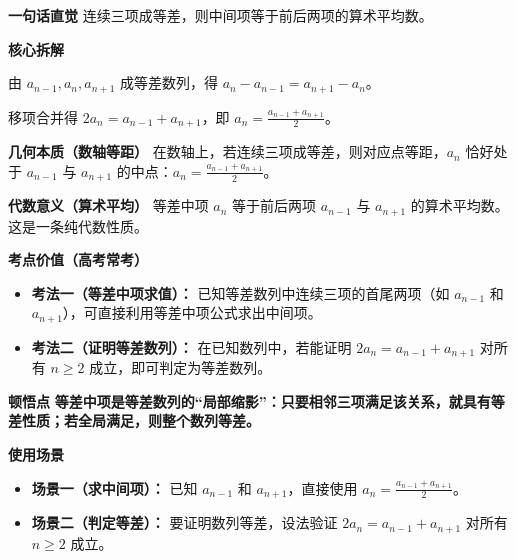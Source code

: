 \begin{explanationbox}
	\textbf{\textcolor{CExplanation}{一句话直觉}}
	连续三项成等差，则中间项等于前后两项的算术平均数。

	\medskip
	\textbf{\textcolor{CExplanation}{核心拆解}}
	\begin{description}[style=nextline, leftmargin=2.8em, labelsep=0.5em, itemsep=0.45em]
		\item[\textbf{要点一（等差定义）：}]
			由 $a_{n-1},a_n,a_{n+1}$ 成等差数列，得 $a_n - a_{n-1} = a_{n+1} - a_n$。
		\item[\textbf{要点二（移项化简）：}]
			移项合并得 $2a_n = a_{n-1}+a_{n+1}$，即 $a_n = \frac{a_{n-1}+a_{n+1}}{2}$。
	\end{description}

	\medskip
	\textbf{\textcolor{CExplanation}{几何本质（数轴等距）}}
	在数轴上，若连续三项成等差，则对应点等距，$a_n$ 恰好处于 $a_{n-1}$ 与 $a_{n+1}$ 的中点：$a_n = \frac{a_{n-1}+a_{n+1}}{2}$。

	\medskip
	\textbf{\textcolor{CExplanation}{代数意义（算术平均）}}
	等差中项 $a_n$ 等于前后两项 $a_{n-1}$ 与 $a_{n+1}$ 的算术平均数。这是一条纯代数性质。

	\medskip
	\textbf{\textcolor{CExplanation}{考点价值（高考常考）}}
	\begin{itemize}[leftmargin=*, itemsep=0.5em, topsep=0.4em]
		\item \textbf{考法一（等差中项求值）：} 已知等差数列中连续三项的首尾两项（如 $a_{n-1}$ 和 $a_{n+1}$），可直接利用等差中项公式求出中间项。
		\item \textbf{考法二（证明等差数列）：} 在已知数列中，若能证明 $2a_n = a_{n-1}+a_{n+1}$ 对所有 $n\ge 2$ 成立，即可判定为等差数列。
	\end{itemize}

	\medskip
	\textbf{\textcolor{CExplanation}{顿悟点}}
	\textbf{等差中项是等差数列的“局部缩影”：只要相邻三项满足该关系，就具有等差性质；若全局满足，则整个数列等差。}

	\medskip
	\textbf{\textcolor{CExplanation}{使用场景}}
	\begin{itemize}[leftmargin=*, itemsep=0.5em, topsep=0.4em]
		\item \textbf{场景一（求中间项）：} 已知 $a_{n-1}$ 和 $a_{n+1}$，直接使用 $a_n = \frac{a_{n-1}+a_{n+1}}{2}$。
		\item \textbf{场景二（判定等差）：} 要证明数列等差，设法验证 $2a_n = a_{n-1}+a_{n+1}$ 对所有 $n\ge 2$ 成立。
	\end{itemize}

\end{explanationbox}
